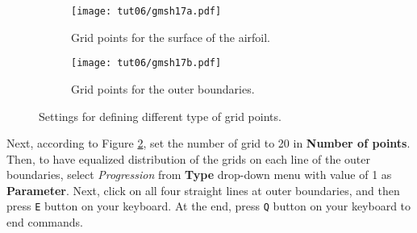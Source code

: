 \begin{figure}[htbp]
    \centering
     \begin{subfigure}[b]{.4\textwidth}
         \centering
         \texttt{[image: tut06/gmsh17a.pdf]}
         \caption{Grid points for the surface of the airfoil.}
         \label{fig6:gmsh17 a}
     \end{subfigure}
     \hfill
     \begin{subfigure}[b]{.4\textwidth}
         \centering
         \texttt{[image: tut06/gmsh17b.pdf]}
         \caption{Grid points for the outer boundaries.}
         \label{fig6:gmsh17 b}
     \end{subfigure}  
    \caption{Settings for defining different type of grid points.}
    \label{fig6:gmsh17}
\end{figure}
Next, according to Figure \ref{fig6:gmsh17 b}, set the number of grid to 20 in \textbf{Number of points}. Then, to have equalized distribution of the grids on each line of the outer boundaries, select \textit{Progression} from \textbf{Type} drop-down menu with value of 1 as \textbf{Parameter}. Next, click on all four straight lines at outer boundaries, and then press \texttt{E} button on your keyboard. At the end, press \texttt{Q} button on your keyboard to end commands.

